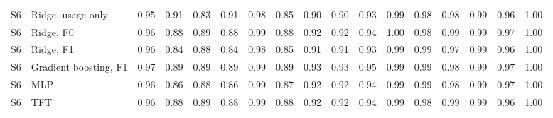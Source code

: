\begin{table}[t]
\begin{tabular}{llccccccccccccccc}
    S6 & Ridge, usage only & 0.95 & 0.91 & 0.83 & 0.91 & 0.98 & 0.85 & 0.90 & 0.90 & 0.93 & 0.99 & 0.98 & 0.98 & 0.99 & 0.96 & 1.00 \\
    S6 & Ridge, F0 & 0.96 & 0.88 & 0.89 & 0.88 & 0.99 & 0.88 & 0.92 & 0.92 & 0.94 & 1.00 & 0.98 & 0.99 & 0.99 & 0.97 & 1.00 \\
    S6 & Ridge, F1 & 0.96 & 0.84 & 0.88 & 0.84 & 0.98 & 0.85 & 0.91 & 0.91 & 0.93 & 0.99 & 0.99 & 0.97 & 0.99 & 0.96 & 1.00 \\
    S6 & Gradient boosting, F1 & 0.97 & 0.89 & 0.89 & 0.89 & 0.99 & 0.89 & 0.93 & 0.93 & 0.95 & 0.99 & 0.99 & 0.98 & 0.99 & 0.97 & 1.00 \\
    S6 & MLP & 0.96 & 0.86 & 0.88 & 0.86 & 0.99 & 0.87 & 0.92 & 0.92 & 0.94 & 0.99 & 0.99 & 0.98 & 0.99 & 0.97 & 1.00 \\
    S6 & TFT & 0.96 & 0.88 & 0.89 & 0.88 & 0.99 & 0.88 & 0.92 & 0.92 & 0.94 & 0.99 & 0.98 & 0.99 & 0.99 & 0.96 & 1.00 \\
    \bottomrule
  \end{tabular}
\end{table}
